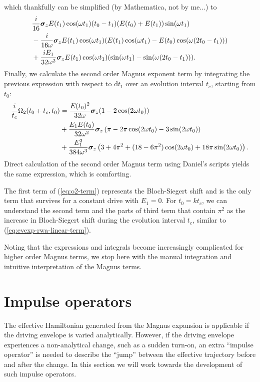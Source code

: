 which thankfully can be simplified (by Mathematica, not by me...) to
\begin{align}
	&\frac{i}{16}\bm{\sigma}_z E(t_1)\cos(\omega t_1) (t_0-t_1)(E(t_0) + E(t_1))\sin(\omega t_1) \nonumber \\
	&-\frac{i}{16 \omega} \bm{\sigma}_z E(t_1)\cos(\omega t_1)(E(t_1)\cos(\omega t_1) -E(t_0) \cos(\omega(2 t_0 - t_1))) \nonumber \\
	&+\frac{i E_1}{32 \omega^2}\bm{\sigma}_z E(t_1) \cos(\omega t_1) (\sin(\omega t_1) - \sin(\omega (2 t_0-t_1))).
\end{align}
Finally, we calculate the second order Magnus exponent term by integrating the previous expression with respect to $\mathrm{d}t_1$ over an evolution interval $t_c$, starting from $t_0$:
\begin{align}
	\frac{i}{t_c}\Omega_2(t_0+t_c,t_0) &= \frac{E(t_0)^2}{32 \omega} \bm{\sigma}_z (1 - 2 \cos(2 \omega t_0)) \nonumber \\
	&+\frac{E_1 E(t_0)}{32 \omega^2} \bm{\sigma}_z \left( \pi - 2\pi \cos(2 \omega t_0) - 3 \sin(2 \omega t_0)\right) \nonumber \\
	&+\frac{E_1^2}{384 \omega^3} \bm{\sigma}_z \left( 3 + 4\pi^2 + (18 - 6 \pi^2) \cos(2 \omega t_0) + 18\pi\sin(2 \omega t_0)\right) \label{eq:o2-term}.
\end{align}
Direct calculation of the second order Magnus term using Daniel's scripts yields the same expression, which is comforting.

The first term of (\ref{eq:o2-term}) represents the Bloch-Siegert shift and is the only term that survives for a constant drive with $E_1 = 0$. For $t_0 = k t_c$, we can understand the second term and the parts of third term that contain $\pi^2$ as the increase in Bloch-Siegert shift during the evolution interval $t_c$, similar to (\ref{eq:evexp-rwa-linear-term}).

Noting that the expressions and integrals become increasingly complicated for higher order Magnus terms, we stop here with the manual integration and intuitive interpretation of the Magnus terms.

\section{Impulse operators}
The effective Hamiltonian generated from the Magnus expansion is applicable if the driving envelope is varied analytically. However, if the driving envelope experiences a non-analytical change, such as a sudden turn-on, an extra ``impulse operator'' is needed to describe the ``jump'' between the effective trajectory before and after the change. In this section we will work towards the development of such impulse operators.

